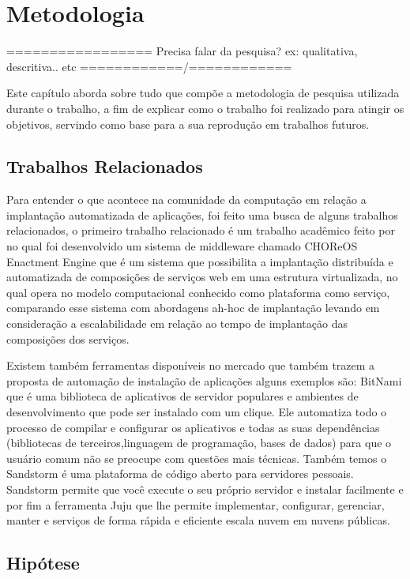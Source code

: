\chapter{Metodologia}
\label{cap-metodologia}

================= Precisa falar da pesquisa? ex: qualitativa, descritiva.. etc ============/============

Este capítulo aborda sobre tudo que compõe a metodologia de pesquisa utilizada
durante o trabalho, a fim de explicar como o trabalho foi realizado para atingir os
objetivos, servindo como base para a sua reprodução em trabalhos futuros.

\section{Trabalhos Relacionados}

Para entender o que acontece na comunidade da computação em relação a implantação
automatizada de aplicações, foi feito uma busca de alguns trabalhos relacionados, o primeiro
trabalho relacionado é um trabalho acadêmico feito por \cite{leo2014} no qual foi
desenvolvido um sistema de middleware chamado CHOReOS Enactment Engine que é um
sistema que possibilita a implantação distribuída e automatizada de composições
de serviços web em uma estrutura virtualizada, no qual opera no modelo
computacional conhecido como plataforma como serviço, comparando esse sistema
com abordagens ah-hoc de implantação levando em consideração a escalabilidade
em relação ao tempo de implantação das composições dos serviços.

Existem também ferramentas disponíveis no mercado que também trazem a proposta
de automação de instalação de aplicações alguns exemplos são: \cite{bitnami}
BitNami que é uma biblioteca de aplicativos de servidor populares e ambientes de
desenvolvimento que pode ser instalado com um clique. Ele automatiza todo o
processo de  compilar e configurar os aplicativos e todas as suas dependências
(bibliotecas de terceiros,linguagem de programação, bases de dados) para que o
usuário comum não se preocupe com questões mais técnicas. Também temos o
\cite{standstormio} Sandstorm é uma plataforma de código aberto para servidores
pessoais. Sandstorm permite que você execute o seu próprio servidor e instalar
facilmente e por fim a ferramenta \cite{juju} Juju que lhe permite implementar,
configurar, gerenciar, manter e serviços de forma rápida e eficiente escala nuvem
em nuvens públicas.

\section{Hipótese}

